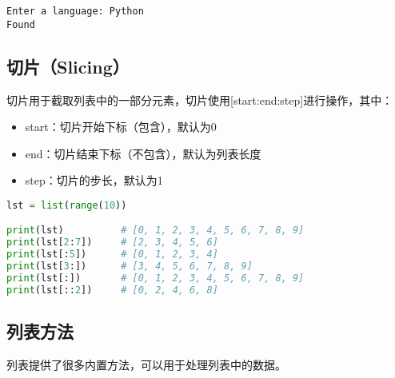 \begin{tcolorbox}
	\begin{verbatim}
Enter a language: Python
Found
\end{verbatim}
\end{tcolorbox}

\vspace{0.5cm}

\subsection{切片（Slicing）}

切片用于截取列表中的一部分元素，切片使用[start:end:step]进行操作，其中：

\begin{itemize}
	\item start：切片开始下标（包含），默认为0
	\item end：切片结束下标（不包含），默认为列表长度
	\item step：切片的步长，默认为1
\end{itemize}

\vspace{-0.5cm}

\begin{lstlisting}[language=Python]
lst = list(range(10))

print(lst)			# [0, 1, 2, 3, 4, 5, 6, 7, 8, 9]
print(lst[2:7])		# [2, 3, 4, 5, 6]
print(lst[:5])		# [0, 1, 2, 3, 4]
print(lst[3:])		# [3, 4, 5, 6, 7, 8, 9]
print(lst[:])		# [0, 1, 2, 3, 4, 5, 6, 7, 8, 9]
print(lst[::2])		# [0, 2, 4, 6, 8]
\end{lstlisting}

\vspace{0.5cm}

\subsection{列表方法}

列表提供了很多内置方法，可以用于处理列表中的数据。\\

